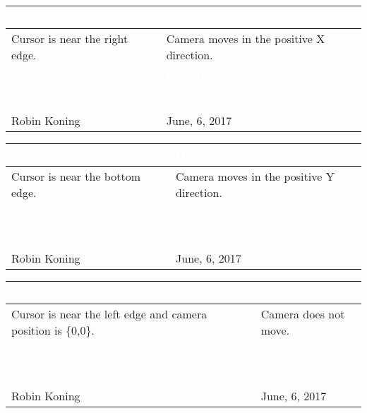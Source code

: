 \begin{tabularx}{\textwidth}{|X|X|}
\hline
\rowcolor{lightgray}\textcolor{white}{\textbf{Test scenario}} &
\textcolor{white}{\textbf{Desired result}}       
\\\hline
Cursor is near the right edge. &
Camera moves in the positive X direction.         
\\\hline
\rowcolor{lightgray}\textcolor{white}{\textbf{Comments/suggestions}} & 
\textcolor{white}{\textbf{Passed}}
\\\hline
 & \cellcolor{green}                       
\\\hline
\rowcolor{lightgray}\textcolor{white}{\textbf{Tester}} & 
\textcolor{white}{\textbf{Date}}               
\\\hline
Robin Koning & June, 6, 2017                               		 
\\\hline
\end{tabularx}

\begin{tabularx}{\textwidth}{|X|X|}
\hline
\rowcolor{lightgray}\textcolor{white}{\textbf{Test scenario}} &
\textcolor{white}{\textbf{Desired result}}       
\\\hline
Cursor is near the bottom edge. &
Camera moves in the positive Y direction.         
\\\hline
\rowcolor{lightgray}\textcolor{white}{\textbf{Comments/suggestions}} & 
\textcolor{white}{\textbf{Passed}}
\\\hline
 & \cellcolor{green}                       
\\\hline
\rowcolor{lightgray}\textcolor{white}{\textbf{Tester}} & 
\textcolor{white}{\textbf{Date}}               
\\\hline
Robin Koning & June, 6, 2017                               		 
\\\hline
\end{tabularx}

\begin{tabularx}{\textwidth}{|X|X|}
\hline
\rowcolor{lightgray}\textcolor{white}{\textbf{Test scenario}} &
\textcolor{white}{\textbf{Desired result}}       
\\\hline
Cursor is near the left edge and camera position is \{0,0\}. &
Camera does not move.         
\\\hline
\rowcolor{lightgray}\textcolor{white}{\textbf{Comments/suggestions}} & 
\textcolor{white}{\textbf{Passed}}
\\\hline
 & \cellcolor{green}                       
\\\hline
\rowcolor{lightgray}\textcolor{white}{\textbf{Tester}} & 
\textcolor{white}{\textbf{Date}}               
\\\hline
Robin Koning & June, 6, 2017                               		 
\\\hline
\end{tabularx}

